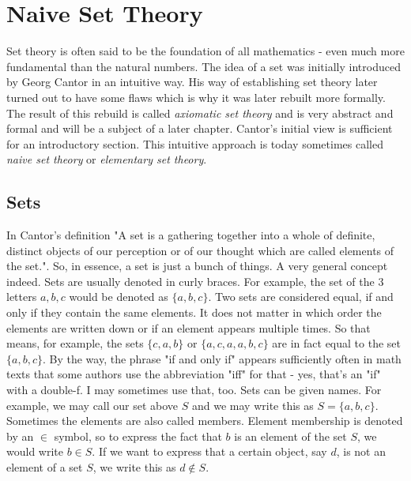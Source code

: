 

\section{Naive Set Theory}
\label{Sec:NaiveSetTheory}
Set theory is often said to be the foundation of all mathematics - even much more fundamental than the natural numbers. The idea of a set was initially introduced by Georg Cantor in an intuitive way. His way of establishing set theory later turned out to have some flaws which is why it was later rebuilt more formally. The result of this rebuild is called \emph{axiomatic set theory} and is very abstract and formal and will be a subject of a later chapter.  Cantor's initial view is sufficient for an introductory section. This intuitive approach is today sometimes called \emph{naive set theory} or \emph{elementary set theory}.




\subsection{Sets}
In Cantor's definition "A set is a gathering together into a whole of definite, distinct objects of our perception or of our thought which are called elements of the set.". So, in essence, a set is just a bunch of things. A very general concept indeed. Sets are usually denoted in curly braces. For example, the set of the 3 letters $a,b,c$ would be denoted as $\{a,b,c\}$. Two sets are considered equal, if and only if they contain the same elements. It does not matter in which order the elements are written down or if an element appears multiple times. So that means, for example, the sets $\{c,a,b\}$ or $\{a,c,a,a,b,c\}$ are in fact equal to the set $\{a,b,c\}$. By the way, the phrase "if and only if" appears sufficiently often in math texts that some authors use the abbreviation "iff" for that - yes, that's an "if" with a double-f. I may sometimes use that, too. Sets can be given names. For example, we may call our set above $S$ and we may write this as $S = \{a,b,c\}$. Sometimes the elements are also called members. Element membership is denoted by an $\in$ symbol, so to express the fact that $b$ is an element of the set $S$, we would write $b \in S$. If we want to express that a certain object, say $d$, is not an element of a set $S$, we write this as $d \notin S$.

